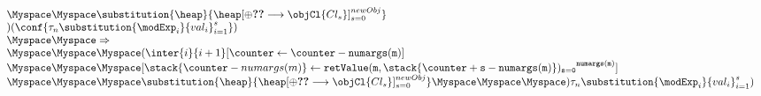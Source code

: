 \begin{enumerate}
\begin{enumerate}
$$\begin{array}{l}
						\Myspace \Myspace \substitution{\heap}{\heap[\oplus \Ref{Cl_s} \longrightarrow \objCl{Cl_s }]_{s=0}^{newObj} } \\
			)(\conf{\state{n} \substitution{\modExp_i  }{val_i}_{i =1}^{s}})  \\
 				 						\Myspace \Myspace \Rightarrow \\  
	 				 	\Myspace \Myspace \Myspace ( \inter{i}{i+1 } [\counter \leftarrow \counter -  \tt{numargs(m)}   ] \\ 
						\Myspace \Myspace \Myspace   [  \stack{\counter -  numargs(m)   } \leftarrow \tt{retValue(m,\stack{\counter + s - numargs(m) })_{s=0} }^{numargs(m) } ] \\
				\Myspace \Myspace \Myspace \substitution{\heap}{\heap[\oplus \Ref{Cl_s} \longrightarrow \objCl{Cl_s }]_{s=0}^{newObj} } 
			\Myspace \Myspace \Myspace){\state{n} \substitution{\modExp_i  }{val_i}_{i =1}^{s}})
		\end{array}
		$$	
	

\end{enumerate}
\end{enumerate}
